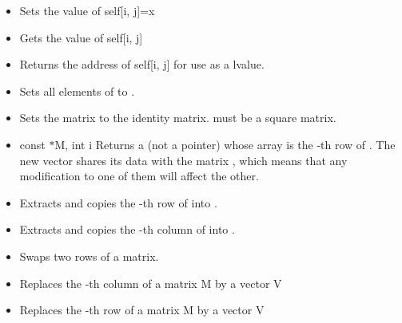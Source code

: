 \begin{itemize}
\item {}
  \sshortdescribe Sets the value of self[i, j]=x  

\item {}
  \sshortdescribe Gets the value of self[i, j]  

\item {}
  \sshortdescribe Returns the address of self[i, j] for use as a lvalue.

\item {}
  \sshortdescribe Sets all elements of  to .
  
\item {}
  \sshortdescribe Sets the matrix  to the identity
  matrix.  must be a square matrix.

\item {}
  {const  $\ast$M, int i}
  \sshortdescribe Returns a  (not a pointer) whose array is
  the -th row of . The new vector shares its data with the
  matrix , which means that any modification to one of them will affect
  the other.
  
\item {}
  \sshortdescribe Extracts and copies the -th row of  into
  .

\item {}
  \sshortdescribe Extracts and copies the -th column of  into .
  
\item {}
  \sshortdescribe Swaps two rows of a matrix.  

\item {}
  \sshortdescribe Replaces the -th column of a matrix M by a vector V 

\item {}
  \sshortdescribe Replaces the -th row of a matrix M by a vector V  
\end{itemize}

